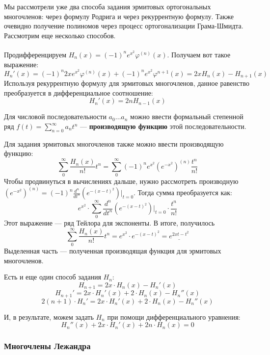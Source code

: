 \documentclass[12pt]{article}
\begin{document}
			Мы рассмотрели уже два способа задания эрмитовых ортогональных многочленов: через формулу Родрига и через рекуррентную формулу.
			Также очевидно получение полиномов через процесс ортогонализации Грама-Шмидта. Рассмотрим еще несколько способов.\\ \\
	
			Продифференцируем $H_n(x) = (-1)^n e^{x^2} \varphi^{(n)}(x)$. Получаем вот такое выражение:
			$$H_n'(x) = (-1)^n 2x e^{x^2} \varphi^{(n)}(x) + (-1)^n e^{x^2} \varphi^{n+1}(x) = 2x H_n(x) - H_{n+1}(x)$$
			Используя рекуррентную формулу для эрмитовых многочленов, данное равенство преобразуется в дифференциальное соотношение:
			$$H_n'(x) = 2n H_{n-1}(x)$$
	
			\begin{defi}
			Для числовой последовательности $a_0 \dots a_n$ можно ввести формальный степенной ряд $f(t) = \sum_{n=0}^{\infty} a_n t^n$ 
			--- \textbf{производящую функцию} этой последовательности.
			\end{defi}
	
			Для задания эрмитовых многочленов также можно ввести производящую функцию:
			$$\sum_0^{\infty} \frac{H_n(x)}{n!} t^n = \sum_0^{\infty} (-1)^n e^{x^2} (e^{-x^2})^{(n)} \frac{t^n}{n!}$$
			Чтобы продвинуться в вычислениях дальше, нужно рассмотреть производную $(e^{-x^2})^{(n)} =
			(-1)^n \frac{d^n}{dt^n} (e^{-(x-t)^2}) |_{t=0}$. Тогда сумма преобразуется как:
			$$e^{x^2} \cdot \sum_0^{\infty} \frac{d^n}{dt^n} (e^{-(x-t)^2}) |_{t=0} \cdot \frac{t^n}{n!}$$
			Этот выражение --- ряд Тейлора для экспоненты. В итоге, получилось
			$$\sum_0^{\infty} \frac{H_n(x)}{n!} t^n = e^{x^2} \cdot e^{-(x-t)^2} = \underline{e^{2xt - t^2}}$$
			Выделенная часть --- полученная производящая функция для эрмитовых многочленов.
	
			Есть и еще один способ задания $H_n$:
			$$H_{n+1} = 2x \cdot H_n(x) - H_n'(x)$$
			$$H_{n+1}' = 2x \cdot H_n'(x) + 2 \cdot H_n(x) - H_n''(x)$$
			$$2(n+1) \cdot H_n' = 2x \cdot H_n'(x) + 2 \cdot H_n(x) - H_n''(x)$$
	
			И, в результате, можем задать $H_n$ при помощи дифференциального уравнения:
			$$H_n''(x) + 2x \cdot H_n'(x) + 2n \cdot H_n(x) = 0$$

		\subsubsection{Многочлены Лежандра}

\end{document}
